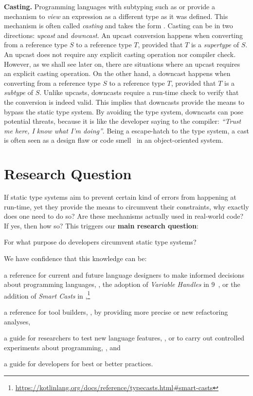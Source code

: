 \textbf{Casting.}
Programming languages with subtyping such as \java{} or \cpp{} provide a mechanism to \emph{view} an expression as a different type as it was defined.
This mechanism is often called \emph{casting} and takes the form .
Casting can be in two directions: \emph{upcast} and \emph{downcast}.
An upcast conversion happens when converting from a reference type $S$ to a reference type $T$, provided that $T$ is a \emph{supertype} of $S$.
An upcast does not require any explicit casting operation nor compiler check.
However, as we shall see later on, there are situations where an upcast requires an explicit casting operation.
On the other hand, a downcast happens when converting from a reference type $S$ to a reference type $T$, provided that $T$ is a \emph{subtype} of $S$.
Unlike upcasts, downcasts require a run-time check to verify that the conversion is indeed valid.
This implies that downcasts provide the means to bypass the static type system.
By avoiding the type system, downcasts can pose potential threats, because it is like the developer saying to the compiler: \emph{``Trust me here, I know what I'm doing''}.
Being a escape-hatch to the type system,
a cast is often seen as a design flaw or code smell~\citep{tufanoWhenWhyYour2015} in an object-oriented system.


\section*{Research Question}

If static type systems aim to prevent certain kind of errors from happening at run-time,
yet they provide the means to circumvent their constraints,
why exactly does one need to do so?
Are these mechanisms actually used in real-world code?
If yes, then how so?
This triggers our \textbf{main research question}:

\begin{mdframed}

\centering
For what purpose do developers circumvent static type systems?
\end{mdframed}

We have confidence that this knowledge can be:
\begin{inparaenum}[a)]
\item a reference for current and future language designers
to make informed decisions about programming languages,
\eg{}, the adoption of \emph{Variable Handles} in \java{} 9~\citep{jep193},
or the addition of \emph{Smart Casts} in ,\footnote{\url{https://kotlinlang.org/docs/reference/typecasts.html\#smart-casts}}
\item a reference for tool builders, \eg{}, by providing more precise or new refactoring analyses,
\item a guide for researchers to test new language features, \eg{}, \cite{wintherGuardedTypePromotion2011} or to carry out controlled experiments about programming, \eg{}, \cite{stuchlikStaticVsDynamic2011} and
\item a guide for developers for best or better practices.
\end{inparaenum}

